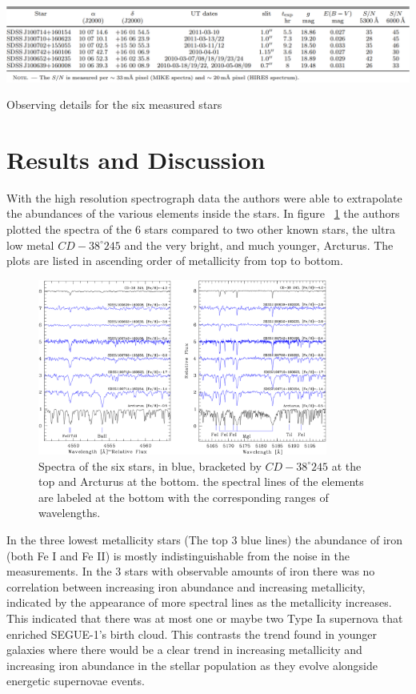 \documentclass{aastex631}
\begin{document}
\begin{table}[!h]
    \includegraphics[width=\textwidth]{obs_detail.png}
    \caption{Observing details for the six measured stars}
    \label{table:obs_detail}
\end{table}

\section{Results and Discussion} \label{sec:dicussion}

With the high resolution spectrograph data the authors were able to extrapolate the abundances of the various elements inside the stars.
In figure ~\ref{fig:spectra} the authors plotted the spectra of the 6 stars compared to two other known stars, the ultra low metal $CD -38^{\circ}245$
and the very bright, and much younger, Arcturus. The plots are listed in ascending order of metallicity from top to bottom.

\begin{figure}[!h]
    \centering
    \includegraphics[width=0.85\textwidth]{spectra.png}
    \caption{Spectra of the six stars, in blue, bracketed by $CD -38^{\circ}245$ at the top and Arcturus at the bottom.
    the spectral lines of the elements are labeled at the bottom with the corresponding ranges of wavelengths.}
    \label{fig:spectra}
\end{figure}

In the three lowest metallicity stars (The top 3 blue lines) the abundance of iron (both Fe I and Fe II) is mostly indistinguishable
from the noise in the measurements. In the 3 stars with observable amounts of iron there was no correlation between increasing
iron abundance and increasing metallicity, indicated by the appearance of more spectral lines as the metallicity increases.
This indicated that there was at most one or maybe two Type Ia supernova that enriched SEGUE-1's birth cloud. This
contrasts the trend found in younger galaxies where there would be a clear trend in increasing metallicity and increasing
iron abundance in the stellar population as they evolve alongside energetic supernovae events.
\end{document}
